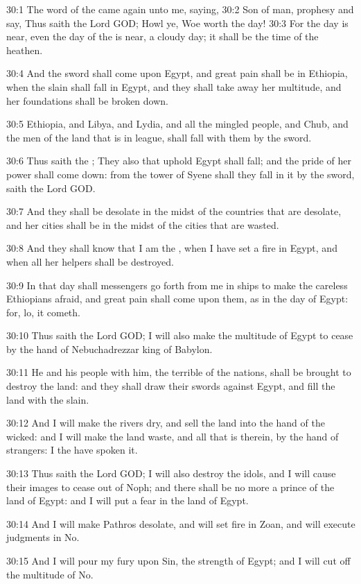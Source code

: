 30:1 The word of the \LORD came again unto me, saying, 30:2 Son of man, prophesy and say, Thus saith the Lord GOD; Howl ye, Woe worth the day!  30:3 For the day is near, even the day of the \LORD is near, a cloudy day; it shall be the time of the heathen.

30:4 And the sword shall come upon Egypt, and great pain shall be in Ethiopia, when the slain shall fall in Egypt, and they shall take away her multitude, and her foundations shall be broken down.

30:5 Ethiopia, and Libya, and Lydia, and all the mingled people, and Chub, and the men of the land that is in league, shall fall with them by the sword.

30:6 Thus saith the \LORD; They also that uphold Egypt shall fall; and the pride of her power shall come down: from the tower of Syene shall they fall in it by the sword, saith the Lord GOD.

30:7 And they shall be desolate in the midst of the countries that are desolate, and her cities shall be in the midst of the cities that are wasted.

30:8 And they shall know that I am the \LORD, when I have set a fire in Egypt, and when all her helpers shall be destroyed.

30:9 In that day shall messengers go forth from me in ships to make the careless Ethiopians afraid, and great pain shall come upon them, as in the day of Egypt: for, lo, it cometh.

30:10 Thus saith the Lord GOD; I will also make the multitude of Egypt to cease by the hand of Nebuchadrezzar king of Babylon.

30:11 He and his people with him, the terrible of the nations, shall be brought to destroy the land: and they shall draw their swords against Egypt, and fill the land with the slain.

30:12 And I will make the rivers dry, and sell the land into the hand of the wicked: and I will make the land waste, and all that is therein, by the hand of strangers: I the \LORD have spoken it.

30:13 Thus saith the Lord GOD; I will also destroy the idols, and I will cause their images to cease out of Noph; and there shall be no more a prince of the land of Egypt: and I will put a fear in the land of Egypt.

30:14 And I will make Pathros desolate, and will set fire in Zoan, and will execute judgments in No.

30:15 And I will pour my fury upon Sin, the strength of Egypt; and I will cut off the multitude of No.

